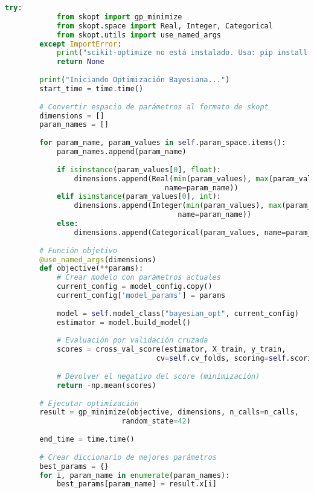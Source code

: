 \begin{lstlisting}[language=Python, caption=Sistema de optimización de hiperparámetros]
        try:
            from skopt import gp_minimize
            from skopt.space import Real, Integer, Categorical
            from skopt.utils import use_named_args
        except ImportError:
            print("scikit-optimize no está instalado. Usa: pip install scikit-optimize")
            return None
        
        print("Iniciando Optimización Bayesiana...")
        start_time = time.time()
        
        # Convertir espacio de parámetros al formato de skopt
        dimensions = []
        param_names = []
        
        for param_name, param_values in self.param_space.items():
            param_names.append(param_name)
            
            if isinstance(param_values[0], float):
                dimensions.append(Real(min(param_values), max(param_values), 
                                     name=param_name))
            elif isinstance(param_values[0], int):
                dimensions.append(Integer(min(param_values), max(param_values), 
                                        name=param_name))
            else:
                dimensions.append(Categorical(param_values, name=param_name))
        
        # Función objetivo
        @use_named_args(dimensions)
        def objective(**params):
            # Crear modelo con parámetros actuales
            current_config = model_config.copy()
            current_config['model_params'] = params
            
            model = self.model_class("bayesian_opt", current_config)
            estimator = model.build_model()
            
            # Evaluación por validación cruzada
            scores = cross_val_score(estimator, X_train, y_train, 
                                   cv=self.cv_folds, scoring=self.scoring)
            
            # Devolver el negativo del score (minimización)
            return -np.mean(scores)
        
        # Ejecutar optimización
        result = gp_minimize(objective, dimensions, n_calls=n_calls, 
                           random_state=42)
        
        end_time = time.time()
        
        # Crear diccionario de mejores parámetros
        best_params = {}
        for i, param_name in enumerate(param_names):
            best_params[param_name] = result.x[i]
        

\end{lstlisting}
